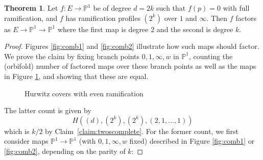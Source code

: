 \documentclass[11pt]{article}           %
\renewcommand{\P}{\mathbb P}
\theoremstyle{definition}
\newtheorem{thm}{Theorem}[section]
\begin{document}
\begin{thm}
  \label{thm:combinatorial}
  Let $f:E\to\P^1$ be of degree $d=2k$ such that $f(p)=0$ with full ramification,
  and $f$ has ramification profiles $(2^k)$ over $1$ and $\infty$. Then $f$ factors as
  $E\to\P^1\to\P^1$ where the first map is degree $2$ and the second is degree $k$.
\end{thm}
\begin{proof}
  Figures \ref{fig:comb1} and \ref{fig:comb2} illustrate how such maps should factor. We prove the claim by fixing branch points $0,1,\infty,w$ in $\P^1$, counting the (orbifold) number of factored
  maps over these branch points as well as the maps in Figure \ref{fig:twos}, and showing that these are equal.

\begin{figure}[h]
  \caption{Hurwitz covers with even ramification}
  \centering
{}

\label{fig:twos}
\end{figure}

  The latter count is given by
  \[
  H((d),(2^k),(2^k),(2,1,\dots,1))
  \]
  which is $k/2$ by Claim~\ref{claim:twoscomplete}. For the former count, we
  first consider maps $\P^1\to\P^1$  (with $0,1,\infty,w$ fixed)
  described in Figure \ref{fig:comb1} or \ref{fig:comb2}, depending on the parity of $k$:


\end{proof}
\end{document}
